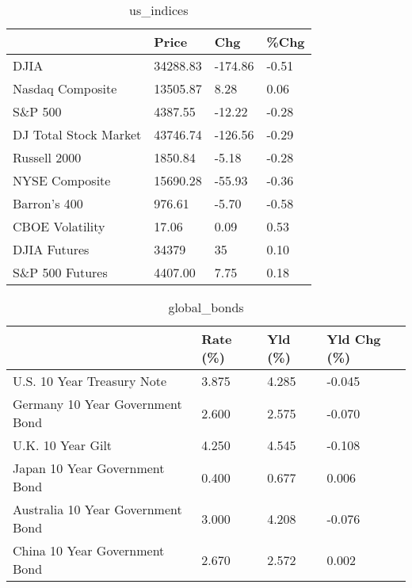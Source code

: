 \documentclass{article}%
\begin{document}
%


\begin{table}[htbp]%
\caption{us\_indices}%
\centering%
\begin{adjustbox}{width=1\textwidth}%
\begin{tabular}{llll}
\toprule
                      &    Price &     Chg &  \%Chg \\
\midrule
                 DJIA & 34288.83 & -174.86 & -0.51 \\
     Nasdaq Composite & 13505.87 &    8.28 &  0.06 \\
              S\&P 500 &  4387.55 &  -12.22 & -0.28 \\
DJ Total Stock Market & 43746.74 & -126.56 & -0.29 \\
         Russell 2000 &  1850.84 &   -5.18 & -0.28 \\
       NYSE Composite & 15690.28 &  -55.93 & -0.36 \\
         Barron's 400 &   976.61 &   -5.70 & -0.58 \\
      CBOE Volatility &    17.06 &    0.09 &  0.53 \\
         DJIA Futures &    34379 &      35 &  0.10 \\
      S\&P 500 Futures &  4407.00 &    7.75 &  0.18 \\
\bottomrule
\end{tabular}
%
\end{adjustbox}%
\end{table}

%


\begin{table}[htbp]%
\caption{global\_bonds}%
\centering%
\begin{adjustbox}{width=1\textwidth}%
\begin{tabular}{llll}
\toprule
                                  & Rate (\%) & Yld (\%) & Yld Chg (\%) \\
\midrule
       U.S. 10 Year Treasury Note &    3.875 &   4.285 &      -0.045 \\
  Germany 10 Year Government Bond &    2.600 &   2.575 &      -0.070 \\
                U.K. 10 Year Gilt &    4.250 &   4.545 &      -0.108 \\
    Japan 10 Year Government Bond &    0.400 &   0.677 &       0.006 \\
Australia 10 Year Government Bond &    3.000 &   4.208 &      -0.076 \\
    China 10 Year Government Bond &    2.670 &   2.572 &       0.002 \\
\bottomrule
\end{tabular}
%
\end{adjustbox}%
\end{table}
\end{document}
